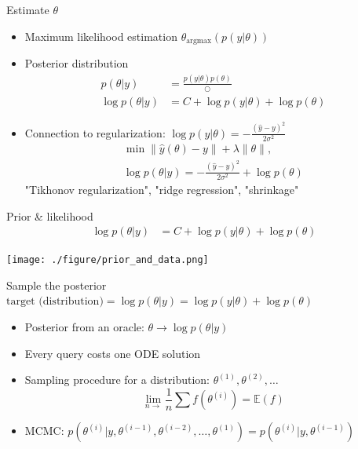 \documentclass[bigger]{beamer}
\begin{document}
\begin{frame}[label={sec:org8624267}]{Estimate \(\theta\)}
\begin{itemize}
\item <1->  Maximum likelihood estimation
\(\theta_{\text{argmax}}(p(y|\theta))\)
\item <2-> Posterior distribution
\begin{align*}
  p(\theta | y) &= \frac{p(y|\theta)p(\theta)}{\bigcirc}\\
  \log{p(\theta|y)} &= C + \log{p(y | \theta)} + \log{p(\theta)}
\end{align*}
\item <3-> Connection to regularization: \(\log{p(y | \theta)}= -\frac{(\hat{y}-y)^2}{2\sigma^2}\)
\begin{align*}
  \min{\|\hat{y}(\theta)-y\| + \lambda\|\theta\|},\\
  \log p(\theta|y)=-\frac{(\hat{y}-y)^2}{2\sigma^2} + \log p(\theta)
\end{align*}
"Tikhonov regularization", "ridge regression", "shrinkage"
\end{itemize}
\end{frame}

\begin{frame}[label={sec:org3353f7b}]{Prior \& likelihood}
\begin{align*}
  \log{p(\theta|y)} &= C + \log{p(y | \theta)} + \log{p(\theta)}
\end{align*}
\begin{center}
\texttt{[image: ./figure/prior\_and\_data.png]}
\end{center}
\end{frame}


\begin{frame}[label={sec:orge5747a3}]{Sample the posterior}
\(\text{target (distribution)} = \log{p(\theta|y)} = \log{p(y | \theta)} + \log{p(\theta)}\)

\begin{itemize}
\item <1-> Posterior from an oracle: \(\theta \rightarrow \log{p(\theta | y)}\)
\item <2-> Every query costs one ODE solution
\item <3-> Sampling procedure for a distribution: \(\theta^{(1)}, \theta^{(2)}, \dots\)
\begin{equation*}
  \lim_{n\rightarrow }\frac{1}{n}\sum{f(\theta^{(i)})}=\mathbb{E}(f)
\end{equation*}
\item <4-> MCMC: \(p(\theta^{(i)} | y, \theta^{(i-1)},  \theta^{(i-2)}, \dots, \theta^{(1)})=p(\theta^{(i)} | y, \theta^{(i-1)})\)
\end{itemize}
\end{frame}
\end{document}
